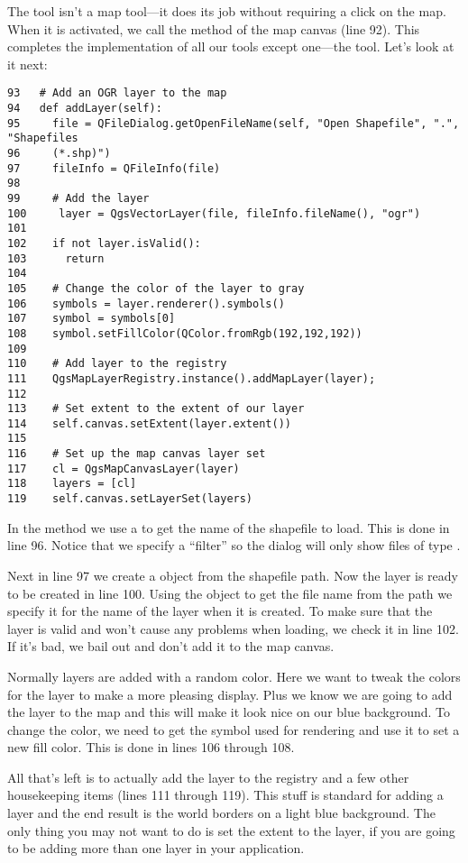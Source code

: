 The  tool isn't a map tool---it does its job
without requiring a click on the map. When it is activated, we call the
 method of the map canvas (line 92).  This completes
the implementation of all our tools except one---the 
tool. %
Let's look at it next:

\begin{verbatim}
93   # Add an OGR layer to the map
94   def addLayer(self):
95     file = QFileDialog.getOpenFileName(self, "Open Shapefile", ".", "Shapefiles
96     (*.shp)")
97     fileInfo = QFileInfo(file)
98 
99     # Add the layer
100     layer = QgsVectorLayer(file, fileInfo.fileName(), "ogr")
101
102    if not layer.isValid():
103      return
104
105    # Change the color of the layer to gray
106    symbols = layer.renderer().symbols()
107    symbol = symbols[0]
108    symbol.setFillColor(QColor.fromRgb(192,192,192))
109
110    # Add layer to the registry
111    QgsMapLayerRegistry.instance().addMapLayer(layer);
112
113    # Set extent to the extent of our layer
114    self.canvas.setExtent(layer.extent())
115
116    # Set up the map canvas layer set
117    cl = QgsMapCanvasLayer(layer)
118    layers = [cl]
119    self.canvas.setLayerSet(layers)
\end{verbatim}

In the  method we use a  to get the
name of the shapefile to load. This is done in line 96.
Notice that we specify a ``filter'' so the dialog will only show files of
type .

Next in line 97 we create a  object from the shapefile
path.  Now the layer is ready to be created in line 100. Using the
 object to get the file name from the path we specify it 
for the name of the layer when it is created.  To make sure that the layer is 
valid and won't cause any problems when loading, we check it in line 102. If
it's bad, we bail out and don't add it to the map canvas.

Normally layers are added with a random color. Here we want to tweak the
colors for the layer to make a more pleasing display. Plus we know we are
going to add the  layer to the map and this will make
it look nice on our blue background. To change the color, we need to get the
symbol used for rendering and use it to set a new fill color. This is done in
lines 106 through 108. 

All that's left is to actually add the layer to the registry and a few other
housekeeping items (lines 111 through 119). This stuff is standard for adding
a layer and the end result is the world borders on a light blue background.
The only thing you may not want to do is set the extent to the layer, if you
are going to be adding more than one layer in your application.

